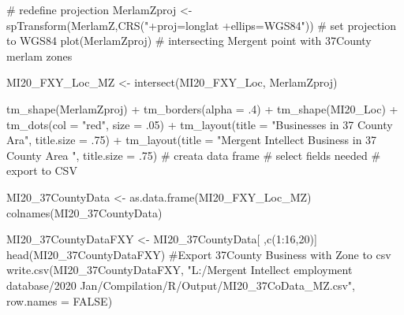 # redefine projection
MerlamZproj <- spTransform(MerlamZ,CRS("+proj=longlat +ellips=WGS84")) # set projection to WGS84
plot(MerlamZproj)
# intersecting Mergent point with 37County merlam zones

MI20_FXY_Loc_MZ <- intersect(MI20_FXY_Loc, MerlamZproj) 

tm_shape(MerlamZproj) + tm_borders(alpha = .4) +
  tm_shape(MI20_Loc) + tm_dots(col = "red", size = .05) +
  tm_layout(title = "Businesses in  37 County Ara", title.size = .75) +
  tm_layout(title = "Mergent  Intellect Business in 37 County Area ", title.size = .75)
# creata data frame
# select fields needed 
# export to CSV

MI20_37CountyData <- as.data.frame(MI20_FXY_Loc_MZ)
colnames(MI20_37CountyData)

MI20_37CountyDataFXY <- MI20_37CountyData[ ,c(1:16,20)]
head(MI20_37CountyDataFXY)
#Export 37County Business with Zone to csv
write.csv(MI20_37CountyDataFXY, "L:/Mergent Intellect employment database/2020 Jan/Compilation/R/Output/MI20_37CoData_MZ.csv", row.names = FALSE)

